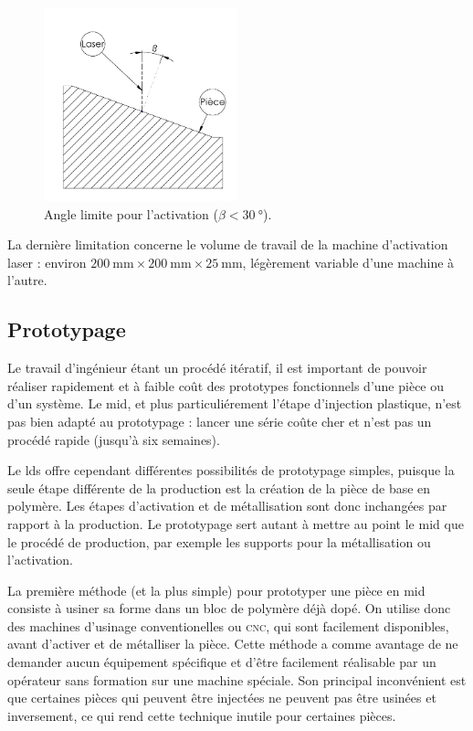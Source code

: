 \begin{figure}[h]
    \begin{center}
        \includegraphics[width=0.5\textwidth]{images/activation_limit}
        \caption{Angle limite pour l'activation ($\beta < \SI{30}{\degree}$).}
        \label{fig:angle-limit}
    \end{center}
\end{figure}

La dernière limitation concerne le volume de travail de la machine d'activation laser : environ $\SI{200}{\milli\meter}\times\SI{200}{\milli\meter}\times\SI{25}{\milli\meter}$, légèrement variable d'une machine à l'autre.

\subsection{Prototypage}
Le travail d'ingénieur étant un procédé itératif, il est important de pouvoir réaliser rapidement et à faible coût des prototypes fonctionnels d'une pièce ou d'un système.
Le \gls{mid}, et plus particuliérement l'étape d'injection plastique, n'est pas bien adapté au prototypage : lancer une série coûte cher et n'est pas un procédé rapide (jusqu'à six semaines).

Le \gls{lds} offre cependant différentes possibilités de prototypage simples, puisque la seule étape différente de la production est la création de la pièce de base en polymère.
Les étapes d'activation et de métallisation sont donc inchangées par rapport à la production.
Le prototypage sert autant à mettre au point le \gls{mid} que le procédé de production, par exemple les supports pour la métallisation ou l'activation.

La première méthode (et la plus simple) pour prototyper une pièce en \gls{mid} consiste à usiner sa forme dans un bloc de polymère déjà dopé.
On utilise donc des machines d'usinage conventionelles ou \textsc{cnc}, qui sont facilement disponibles, avant d'activer et de métalliser la pièce.
Cette méthode a comme avantage de ne demander aucun équipement spécifique et d'être facilement réalisable par un opérateur sans formation sur une machine spéciale.
Son principal inconvénient est que certaines pièces qui peuvent être injectées ne peuvent pas être usinées et inversement, ce qui rend cette technique inutile pour certaines pièces.

